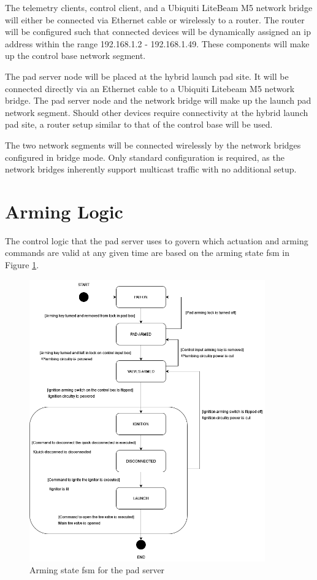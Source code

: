 The telemetry clients, control client, and a Ubiquiti LiteBeam M5 network bridge will either be connected via Ethernet cable 
or wirelessly to a router. The router will be configured such that connected devices will be dynamically assigned
an \gls{ip} address within the range 192.168.1.2 - 192.168.1.49. These components will make up the control base network segment.

The pad server node will be placed at the hybrid launch pad site. It will be connected directly via an Ethernet cable to a Ubiquiti
Litebeam M5 network bridge. The pad server node and the network bridge will make up the launch pad network segment. Should other devices
require connectivity at the hybrid launch pad site, a router setup similar to that of the control base will be used.

The two network segments will be connected wirelessly by the network bridges configured in bridge mode. Only standard configuration is 
required, as the network bridges inherently support multicast traffic with no additional setup.

\section{Arming Logic}

The control logic that the pad server uses to govern which actuation and arming commands are valid at any given time
are based on the arming state \gls{fsm} in Figure \ref{fig:arming-fsm}.

\begin{figure}[H]
    \center
    \includegraphics[width=4in]{assets/diagrams/Hybrid_Control_FSM.png}
    \caption{Arming state \gls{fsm} for the pad server}
    \label{fig:arming-fsm}
\end{figure}

